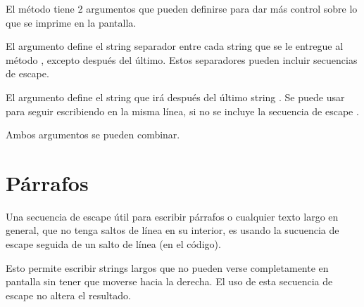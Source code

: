 
El método  tiene 2 argumentos que pueden definirse para dar más control sobre lo que se imprime en la pantalla.
\medskip

El argumento  define el string separador entre cada string  que se le entregue al método , excepto después del último.
Estos separadores pueden incluir secuencias de escape.


El argumento  define el string que irá después del último string .
Se puede usar para seguir escribiendo en la misma línea, si no se incluye la secuencia de escape .



Ambos argumentos se pueden combinar.


\section{Párrafos}

Una secuencia de escape útil para escribir párrafos o cualquier texto largo en general, que no tenga saltos de línea en su interior, es usando la sucuencia de escape \ttt{\textbackslash} seguida de un salto de línea (en el código).
\medskip

Esto permite escribir strings largos que no pueden verse completamente en pantalla sin tener que moverse hacia la derecha.
El uso de esta secuencia de escape no altera el resultado.



\clearpage